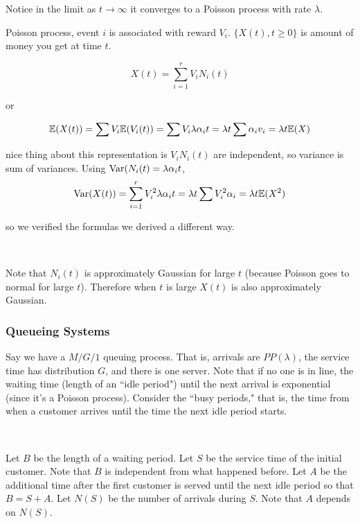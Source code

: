 \begin{remark}
Notice in the limit as \(t \to \infty\) it converges to a Poisson process with rate \(\lambda\).
\end{remark}

\begin{example}
Poisson process, event \(i\) is associated with reward \(V_i\). \(\{X(t), t \geq 0 \} \) is amount of money you get at time \(t\).

\begin{equation}
X(t) = \sum_{i=1}^r V_i N_i(t)
\end{equation}

or

\[
\E(X(t)) = \sum V_i \E(V_i (t)) = \sum V_i \lambda \alpha_i t = \lambda t \sum \alpha_i v_i = \lambda t \E(X)
\]

nice thing about this representation is \(V_i N_i(t)\) are independent, so variance is sum of variances. Using \(\Var(N_i(t) =  \lambda \alpha_i t\), 
\[
\Var(X(t)) = \sum_{i=1}^r V_i^2 \lambda \alpha_i t = \lambda t \sum V_i^2 \alpha_i = \lambda t \E(X^2)
\]

so we verified the formulas we derived a different way.

\

Note that \(N_i(t)\) is approximately Gaussian for large \(t\) (because Poisson goes to normal for large \(t\)). Therefore when \(t\) is large \(X(t)\) is also approximately Gaussian.

\end{example}

\subsubsection{Queueing Systems}

Say we have a \(M/G/1\) queuing process. That is, arrivals are \(PP(\lambda)\), the service time has distribution \(G\), and there is one server. Note that if no one is in line, the waiting time  (length of an ``idle period") until the next arrival is exponential (since it's a Poisson process). Consider the ``busy periods," that is, the time from when a customer arrives until the time the next idle period starts. 

\

Let \(B\) be the length of a waiting period. Let \(S\) be the service time of the initial customer. Note that \(B\) is independent from what happened before. Let \(A\) be the additional time after the first customer is served until the next idle period so that \(B = S + A\). Let \(N(S)\) be the number of arrivals during \(S\). Note that \(A\) depends on \(N(S)\).


